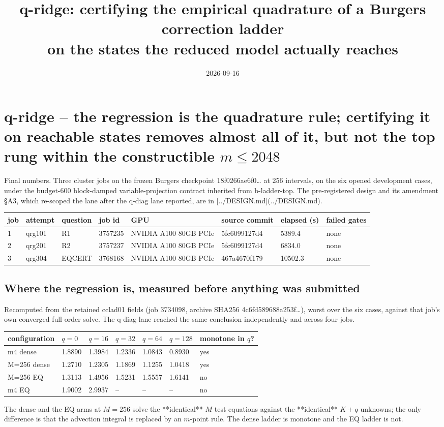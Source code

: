 \documentclass[11pt]{article}
\title{q-ridge: certifying the empirical quadrature of a Burgers correction ladder\\
on the states the reduced model actually reaches}
\date{2026-09-16}
\begin{document}
\maketitle
\section{q-ridge -- the regression is the quadrature rule; certifying it on reachable states removes almost all of it, but not the top rung within the constructible $m \le 2048$}
Final numbers. Three cluster jobs on the frozen Burgers checkpoint 18f0266ae6f0… at 256 intervals, on the six opened development cases, under the budget-600 block-damped variable-projection contract inherited from b-ladder-top. The pre-registered design and its amendment §A3, which re-scoped the lane after the q-diag lane reported, are in [../DESIGN.md](../DESIGN.md).

\begin{table}[htbp]\centering\small
\begin{tabular}{llllllll}\hline
job & attempt & question & job id & GPU & source commit & elapsed (s) & failed gates \\ \hline
1 & qrg101 & R1 & 3757235 & NVIDIA A100 80GB PCIe & 5fc6099127d4 & 5389.4 & none \\
2 & qrg201 & R2 & 3757237 & NVIDIA A100 80GB PCIe & 5fc6099127d4 & 6834.0 & none \\
3 & qrg304 & EQCERT & 3768168 & NVIDIA A100 80GB PCIe & 467a4670f179 & 10502.3 & none \\
\hline\end{tabular}
\end{table}
\subsection{Where the regression is, measured before anything was submitted}
Recomputed from the retained cclad01 fields (job 3734098, archive SHA256 4c6fd589688a253f…), worst over the six cases, against that job's own converged full-order solve. The q-diag lane reached the same conclusion independently and across four jobs.

\begin{table}[htbp]\centering\small
\begin{tabular}{lllllll}\hline
configuration & $q=0$ & $q=16$ & $q=32$ & $q=64$ & $q=128$ & monotone in $q$? \\ \hline
m4 dense & 1.8890 & 1.3984 & 1.2336 & 1.0843 & 0.8930 & yes \\
M=256 dense & 1.2710 & 1.2305 & 1.1869 & 1.1255 & 1.0418 & yes \\
M=256 EQ & 1.3113 & 1.4956 & 1.5231 & 1.5557 & 1.6141 & no \\
m4 EQ & 1.9002 & 2.9937 & -- & -- & -- & no \\
\hline\end{tabular}
\end{table}
The dense and the EQ arms at $M=256$ solve the **identical** $M$ test equations against the **identical** $K+q$ unknowns; the only difference is that the advection integral is replaced by an $m$-point rule. The dense ladder is monotone and the EQ ladder is not.
\end{document}

